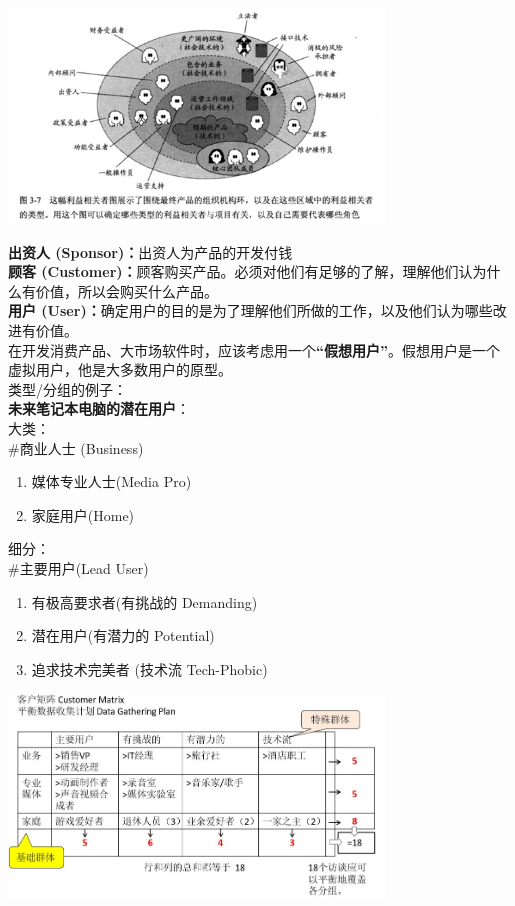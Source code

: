 \includegraphics[width=10cm]{7_利益相关者1.png}

\textbf{出资人 (Sponsor)：}出资人为产品的开发付钱\\
\textbf{顾客
(Customer)：}顾客购买产品。必须对他们有足够的了解，理解他们认为什么有价值，所以会购买什么产品。\\
\textbf{用户
(User)：}确定用户的目的是为了理解他们所做的工作，以及他们认为哪些改进有价值。\\
在开发消费产品、大市场软件时，应该考虑用一个\textbf{``假想用户''}。假想用户是一个虚拟用户，他是大多数用户的原型。\\
类型/分组的例子：\\
\textbf{未来笔记本电脑的潜在用户}：\\
大类：\\
\#商业人士 (Business)

\begin{enumerate}
\tightlist
\item
  媒体专业人士(Media Pro)
\item
  家庭用户(Home)
\end{enumerate}

细分：\\
\#主要用户(Lead User)

\begin{enumerate}
\tightlist
\item
  有极高要求者(有挑战的 Demanding)
\item
  潜在用户(有潜力的 Potential)
\item
  追求技术完美者 (技术流 Tech-Phobic)
\end{enumerate}


\includegraphics[width=10cm]{CustomerMatrixScreenshot_2022-12-16_180326.jpg}

